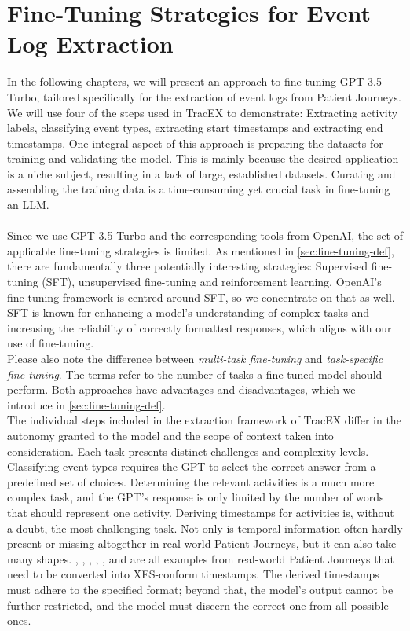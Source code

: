 \section{Fine-Tuning Strategies for Event Log Extraction}\label{sec:fine}
In the following chapters, we will present an approach to fine-tuning GPT-3.5 Turbo, tailored specifically for the extraction of event logs from Patient Journeys. We will use four of the steps used in TracEX to demonstrate: Extracting activity labels, classifying event types, extracting start timestamps and extracting end timestamps. One integral aspect of this approach is preparing the datasets for training and validating the model. This is mainly because the desired application is a niche subject, resulting in a lack of large, established datasets. Curating and assembling the training data is a time-consuming yet crucial task in fine-tuning an LLM.\\\\
Since we use GPT-3.5 Turbo and the corresponding tools from OpenAI, the set of applicable fine-tuning strategies is limited. As mentioned in \autoref{sec:fine-tuning-def}, there are fundamentally three potentially interesting strategies: Supervised fine-tuning (SFT), unsupervised fine-tuning and reinforcement learning. OpenAI's fine-tuning framework is centred around SFT, so we concentrate on that as well. SFT is known for enhancing a model's understanding of complex tasks and increasing the reliability of correctly formatted responses, which aligns with our use of fine-tuning.\\
Please also note the difference between \emph{multi-task fine-tuning} and \emph{task-specific fine-tuning}. The terms refer to the number of tasks a fine-tuned model should perform. Both approaches have advantages and disadvantages, which we introduce in \autoref{sec:fine-tuning-def}.\\
The individual steps included in the extraction framework of TracEX differ in the autonomy granted to the model and the scope of context taken into consideration. Each task presents distinct challenges and complexity levels.
Classifying event types requires the GPT to select the correct answer from a predefined set of choices. Determining the relevant activities is a much more complex task, and the GPT's response is only limited by the number of words that should represent one activity. Deriving timestamps for activities is, without a doubt, the most challenging task. Not only is temporal information often hardly present or missing altogether in real-world Patient Journeys, but it can also take many shapes. , , , , , and  are all examples from real-world Patient Journeys that need to be converted into XES-conform timestamps. The derived timestamps must adhere to the specified format; beyond that, the model's output cannot be further restricted, and the model must discern the correct one from all possible ones.\\
